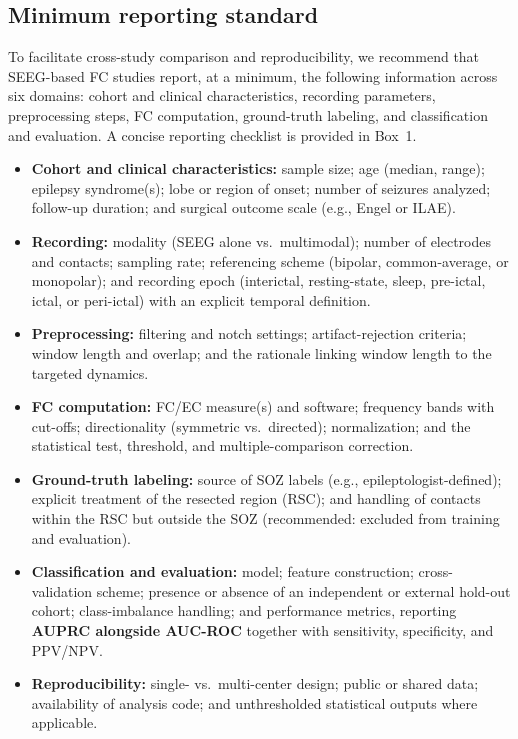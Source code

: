 \documentclass[12pt]{article}
\begin{document}
\subsection{Minimum reporting standard}
To facilitate cross-study comparison and reproducibility, we recommend that SEEG-based FC studies report, at a minimum, the following information across six domains: cohort and clinical characteristics, recording parameters, preprocessing steps, FC computation, ground-truth labeling, and classification and evaluation. A concise reporting checklist is provided in Box~1.
\begin{itemize}
  \item \textbf{Cohort and clinical characteristics:} sample size; age (median, range); epilepsy syndrome(s); lobe or region of onset; number of seizures analyzed; follow-up duration; and surgical outcome scale (e.g., Engel or ILAE).
  \item \textbf{Recording:} modality (SEEG alone vs.\ multimodal); number of electrodes and contacts; sampling rate; referencing scheme (bipolar, common-average, or monopolar); and recording epoch (interictal, resting-state, sleep, pre-ictal, ictal, or peri-ictal) with an explicit temporal definition.
  \item \textbf{Preprocessing:} filtering and notch settings; artifact-rejection criteria; window length and overlap; and the rationale linking window length to the targeted dynamics.
  \item \textbf{FC computation:} FC/EC measure(s) and software; frequency bands with cut-offs; directionality (symmetric vs.\ directed); normalization; and the statistical test, threshold, and multiple-comparison correction.
  \item \textbf{Ground-truth labeling:} source of SOZ labels (e.g., epileptologist-defined); explicit treatment of the resected region (RSC); and handling of contacts within the RSC but outside the SOZ (recommended: excluded from training and evaluation).
  \item \textbf{Classification and evaluation:} model; feature construction; cross-validation scheme; presence or absence of an independent or external hold-out cohort; class-imbalance handling; and performance metrics, reporting \textbf{AUPRC alongside AUC-ROC} together with sensitivity, specificity, and PPV/NPV.
  \item \textbf{Reproducibility:} single- vs.\ multi-center design; public or shared data; availability of analysis code; and unthresholded statistical outputs where applicable.
\end{itemize}
\end{document}
